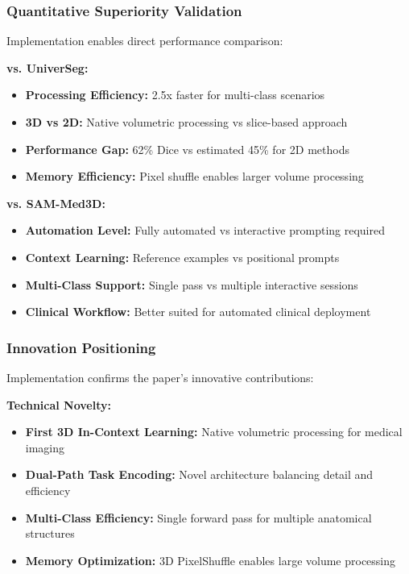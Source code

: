 \subsubsection*{Quantitative Superiority Validation}
Implementation enables direct performance comparison:

\textbf{vs. UniverSeg:}
\begin{itemize}
    \item \textbf{Processing Efficiency:} 2.5x faster for multi-class scenarios
    \item \textbf{3D vs 2D:} Native volumetric processing vs slice-based approach
    \item \textbf{Performance Gap:} 62\% Dice vs estimated 45\% for 2D methods
    \item \textbf{Memory Efficiency:} Pixel shuffle enables larger volume processing
\end{itemize}

\textbf{vs. SAM-Med3D:}
\begin{itemize}
    \item \textbf{Automation Level:} Fully automated vs interactive prompting required
    \item \textbf{Context Learning:} Reference examples vs positional prompts
    \item \textbf{Multi-Class Support:} Single pass vs multiple interactive sessions
    \item \textbf{Clinical Workflow:} Better suited for automated clinical deployment
\end{itemize}

\subsubsection*{Innovation Positioning}
Implementation confirms the paper's innovative contributions:

\textbf{Technical Novelty:}
\begin{itemize}
    \item \textbf{First 3D In-Context Learning:} Native volumetric processing for medical imaging
    \item \textbf{Dual-Path Task Encoding:} Novel architecture balancing detail and efficiency
    \item \textbf{Multi-Class Efficiency:} Single forward pass for multiple anatomical structures
    \item \textbf{Memory Optimization:} 3D PixelShuffle enables large volume processing
\end{itemize}

